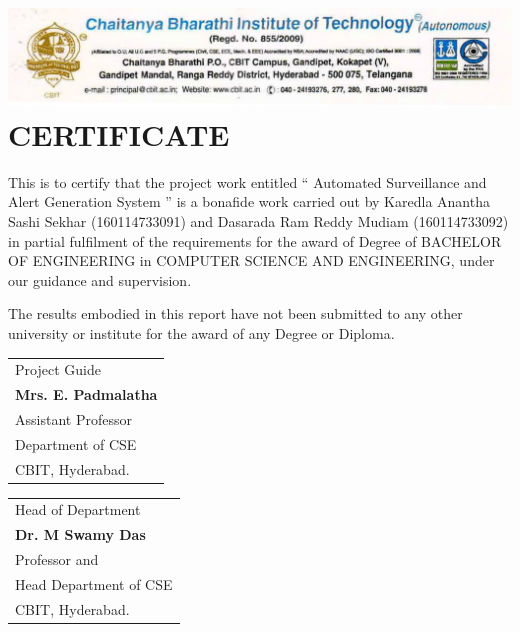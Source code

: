 \cleardoublepage
{}
{}

\chapter*{\includegraphics[width=1\textwidth]{./certi} CERTIFICATE}

\normalsize This is to certify that the project work entitled “ Automated Surveillance and Alert Generation System ” is a bonafide work carried out by Karedla Anantha Sashi Sekhar (160114733091) and Dasarada Ram Reddy Mudiam (160114733092) in partial fulfilment of the requirements for the award of Degree of BACHELOR OF ENGINEERING in COMPUTER SCIENCE AND ENGINEERING, under our guidance and supervision.

The results embodied in this report have not been submitted to any other university or institute for the award of any Degree or Diploma.\\[1.0cm]

\vfill\noindent
\begin{tabular}[t]{@{}l} 
  Project Guide\\ \textbf{Mrs. E. Padmalatha}\\ Assistant Professor\\ Department of CSE\\ CBIT, Hyderabad.
\end{tabular}
\hfill%
\begin{tabular}[t]{l@{}}
   Head of Department\\ \textbf{Dr. M Swamy Das}\\ Professor and \\Head Department of CSE\\ CBIT, Hyderabad.
\end{tabular}